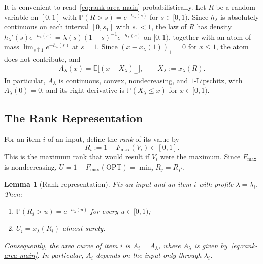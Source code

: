 \documentclass[11pt]{article}
\newtheorem{lemma}[theorem]{Lemma}
\theoremstyle{definition}
\theoremstyle{remark}
\newcommand{\Pp}{\mathbb P}
\newcommand{\E}{\mathbb E}
\newcommand{\OPT}{\mathrm{OPT}}
\begin{document}
It is convenient to read~\eqref{eq:rank-area-main} probabilistically.
Let $R$ be a random variable on $[0,1]$ with $\Pp(R>s)=e^{-h_\lambda(s)}$ for $s\in[0,1)$.
Since $h_\lambda$ is absolutely continuous on each interval $[0,s_1]$ with $s_1<1$, the law of $R$ has density $h_\lambda'(s)e^{-h_\lambda(s)}=\lambda(s)(1-s)^{-1}e^{-h_\lambda(s)}$ on $[0,1)$, together with an atom of mass $\lim_{s\uparrow1}e^{-h_\lambda(s)}$ at $s=1$.
Since $(x-x_\lambda(1))_+=0$ for $x\le1$, the atom does not contribute, and
\begin{equation}\label{eq:rank-area-expectation}
 A_\lambda(x)=\E\bigl[(x-X_\lambda)_+\bigr],
 \qquad
 X_\lambda:=x_\lambda(R).
\end{equation}
In particular, $A_\lambda$ is continuous, convex, nondecreasing, and $1$-Lipschitz, with $A_\lambda(0)=0$, and its right derivative is $\Pp(X_\lambda\le x)$ for $x\in[0,1)$.

\subsection{The Rank Representation}

For an item $i$ of an input, define the \emph{rank} of its value by
\[
 R_i:=1-F_{\max}(V_i)\in[0,1].
\]
This is the maximum rank that would result if $V_i$ were the maximum.
Since $F_{\max}$ is nondecreasing, $U=1-F_{\max}(\OPT)=\min_jR_j=R_{I^*}$.

\begin{lemma}[Rank representation]\label{lem:rank-representation}
Fix an input and an item $i$ with profile $\lambda=\lambda_i$.
Then:
\begin{enumerate}
\item[(a)] $\Pp(R_i>u)=e^{-h_\lambda(u)}$ for every $u\in[0,1)$;
\item[(b)] $U_i=x_\lambda(R_i)$ almost surely.
\end{enumerate}
Consequently, the area curve of item $i$ is $A_i=A_\lambda$, where $A_\lambda$ is given by~\eqref{eq:rank-area-main}.
In particular, $A_i$ depends on the input only through $\lambda_i$.
\end{lemma}
\end{document}

